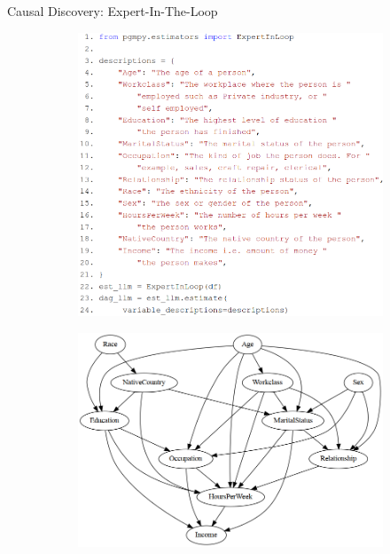 \documentclass{beamer}
\begin{document}
\begin{frame}{Causal Discovery: Expert-In-The-Loop}
	\begin{figure}
		\begin{subfigure}{0.5 \textwidth}
			\centering
			\includegraphics[scale=0.22]{imgs/dag_llm.png}
		\end{subfigure}%
		\begin{subfigure}{0.5 \textwidth}
			\centering
			\includegraphics[scale=0.22]{imgs/adult_llm.png}
		\end{subfigure}
	\end{figure}

\end{frame}
\end{document}

